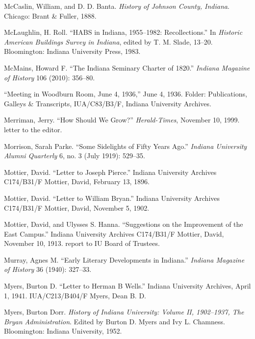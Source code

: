 \documentclass[
  american,
  letterpaper,
]{scrreprt}
\newlength{\cslhangindent}
\newenvironment{CSLReferences}[2] %
 {\begin{list}{}{%
  \setlength{\itemindent}{0pt}
  \setlength{\leftmargin}{0pt}
  \setlength{\parsep}{0pt}
  \ifodd #1
   \setlength{\leftmargin}{\cslhangindent}
   \setlength{\itemindent}{-1\cslhangindent}
  \fi
  \setlength{\itemsep}{#2\baselineskip}}}
 {\end{list}}
\begin{document}
\begin{CSLReferences}{1}{0}
McCaslin, William, and D. D. Banta. \emph{History of Johnson County,
Indiana}. Chicago: Brant \& Fuller, 1888.

McLaughlin, H. Roll. {``HABS in Indiana, 1955--1982: Recollections.''}
In \emph{Historic American Buildings Survey in Indiana}, edited by T. M.
Slade, 13--20. Bloomington: Indiana University Press, 1983.

McMains, Howard F. {``The Indiana Seminary Charter of 1820.''}
\emph{Indiana Magazine of History} 106 (2010): 356--80.

{``Meeting in Woodburn Room, June 4, 1936,''} June 4, 1936. Folder:
Publications, Galleys \& Transcripts, IUA/C83/B3/F, Indiana University
Archives.

Merriman, Jerry. {``How Should We Grow?''} \emph{Herald-Times}, November
10, 1999. letter to the editor.

Morrison, Sarah Parke. {``Some Sidelights of Fifty Years Ago.''}
\emph{Indiana University Alumni Quarterly} 6, no. 3 (July 1919):
529--35.

Mottier, David. {``Letter to Joseph Pierce.''} Indiana University
Archives C174/B31/F Mottier, David, February 13, 1896.

Mottier, David. {``Letter to William Bryan.''} Indiana University
Archives C174/B31/F Mottier, David, November 5, 1902.

Mottier, David, and Ulysses S. Hanna. {``Suggestions on the Improvement
of the East Campus.''} Indiana University Archives C174/B31/F Mottier,
David, November 10, 1913. report to IU Board of Trustees.

Murray, Agnes M. {``Early Literary Developments in Indiana.''}
\emph{Indiana Magazine of History} 36 (1940): 327--33.

Myers, Burton D. {``Letter to Herman {B} Wells.''} Indiana University
Archives, April 1, 1941. IUA/C213/B404/F Myers, Dean B. D.

Myers, Burton Dorr. \emph{History of Indiana University: Volume {II},
1902--1937, {The} Bryan Administration}. Edited by Burton D. Myers and
Ivy L. Chamness. Bloomington: Indiana University, 1952.


\end{CSLReferences}
\end{document}
